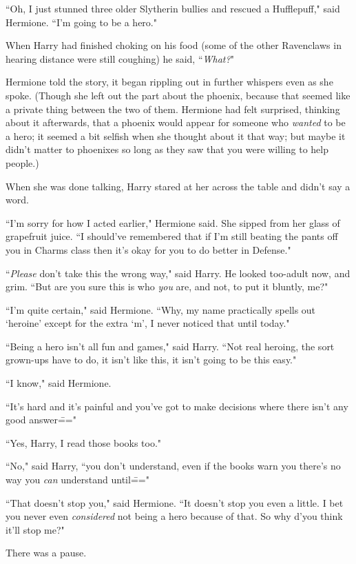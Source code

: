 ``Oh, I just stunned three older Slytherin bullies and rescued a Hufflepuff," said Hermione. ``I'm going to be a hero."

When Harry had finished choking on his food (some of the other Ravenclaws in hearing distance were still coughing) he said, ``\emph{What?}"

Hermione told the story, it began rippling out in further whispers even as she spoke. (Though she left out the part about the phoenix, because that seemed like a private thing between the two of them. Hermione had felt surprised, thinking about it afterwards, that a phoenix would appear for someone who \emph{wanted} to be a hero; it seemed a bit selfish when she thought about it that way; but maybe it didn't matter to phoenixes so long as they saw that you were willing to help people.)

When she was done talking, Harry stared at her across the table and didn't say a word.

``I'm sorry for how I acted earlier," Hermione said. She sipped from her glass of grapefruit juice. ``I should've remembered that if I'm still beating the pants off you in Charms class then it's okay for you to do better in Defense."

``\emph{Please} don't take this the wrong way," said Harry. He looked too-adult now, and grim. ``But are you sure this is who \emph{you} are, and not, to put it bluntly, me?"

``I'm quite certain," said Hermione. ``Why, my name practically spells out `heroine' except for the extra `m', I never noticed that until today."

``Being a hero isn't all fun and games," said Harry. ``Not real heroing, the sort grown-ups have to do, it isn't like this, it isn't going to be this easy."

``I know," said Hermione.

``It's hard and it's painful and you've got to make decisions where there isn't any good answer\==="

``Yes, Harry, I read those books too."

``No," said Harry, ``you don't understand, even if the books warn you there's no way you \emph{can} understand until\==="

``That doesn't stop you," said Hermione. ``It doesn't stop you even a little. I bet you never even \emph{considered} not being a hero because of that. So why d'you think it'll stop me?"

There was a pause.

